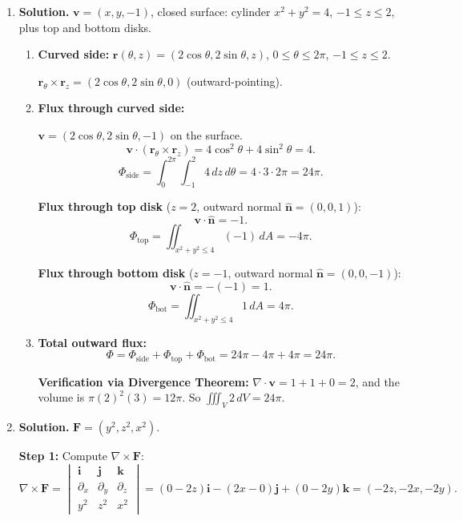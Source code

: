 \begin{enumerate}
\begin{enumerate}
\begin{align*}
\mathbf{F}\cdot\mathbf{n} &= 2x(-1)+3y(-2)+(-(x+2y))(1) \\
&= -2x-6y-x-2y = -3x-8y.
\end{align*}

\[
\boxed{\iint_S\mathbf{F}\cdot d\mathbf{S} = \int_0^2\int_0^1(-3x-8y)\,dx\,dy.}
\]
\end{enumerate}

\item \textbf{Solution.}
$\mathbf{v}=(x,y,-1)$, closed surface: cylinder $x^2+y^2=4$, $-1\le z\le 2$, plus top and bottom disks.

\begin{enumerate}
\item \textbf{Curved side:} $\mathbf{r}(\theta,z)=(2\cos\theta, 2\sin\theta, z)$, $0\le\theta\le 2\pi$, $-1\le z\le 2$.

$\mathbf{r}_\theta\times\mathbf{r}_z = (2\cos\theta, 2\sin\theta, 0)$ (outward-pointing).

\item \textbf{Flux through curved side:}

$\mathbf{v}=(2\cos\theta, 2\sin\theta, -1)$ on the surface.
\[
\mathbf{v}\cdot(\mathbf{r}_\theta\times\mathbf{r}_z) = 4\cos^2\theta+4\sin^2\theta = 4.
\]
\[
\Phi_{\text{side}} = \int_0^{2\pi}\int_{-1}^{2}4\,dz\,d\theta = 4\cdot 3\cdot 2\pi = 24\pi.
\]

\textbf{Flux through top disk} ($z=2$, outward normal $\hat{\mathbf{n}}=(0,0,1)$):
\[
\mathbf{v}\cdot\hat{\mathbf{n}} = -1.
\]
\[
\Phi_{\text{top}} = \iint_{x^2+y^2\le 4}(-1)\,dA = -4\pi.
\]

\textbf{Flux through bottom disk} ($z=-1$, outward normal $\hat{\mathbf{n}}=(0,0,-1)$):
\[
\mathbf{v}\cdot\hat{\mathbf{n}} = -(-1) = 1.
\]
\[
\Phi_{\text{bot}} = \iint_{x^2+y^2\le 4}1\,dA = 4\pi.
\]

\item \textbf{Total outward flux:}
\[
\Phi = \Phi_{\text{side}}+\Phi_{\text{top}}+\Phi_{\text{bot}} = 24\pi - 4\pi + 4\pi = \boxed{24\pi}.
\]

\textbf{Verification via Divergence Theorem:} $\nabla\cdot\mathbf{v}=1+1+0=2$, and the volume is $\pi(2)^2(3)=12\pi$. So $\iiint_V 2\,dV = 24\pi$.
\end{enumerate}

\item \textbf{Solution.}
$\mathbf{F}=(y^2, z^2, x^2)$.

\textbf{Step 1:} Compute $\nabla\times\mathbf{F}$:
\[
\nabla\times\mathbf{F} = \begin{vmatrix}\mathbf{i}&\mathbf{j}&\mathbf{k}\\ \partial_x&\partial_y&\partial_z\\ y^2&z^2&x^2\end{vmatrix} = (0-2z)\mathbf{i}-(2x-0)\mathbf{j}+(0-2y)\mathbf{k} = (-2z,-2x,-2y).
\]


\end{enumerate}
